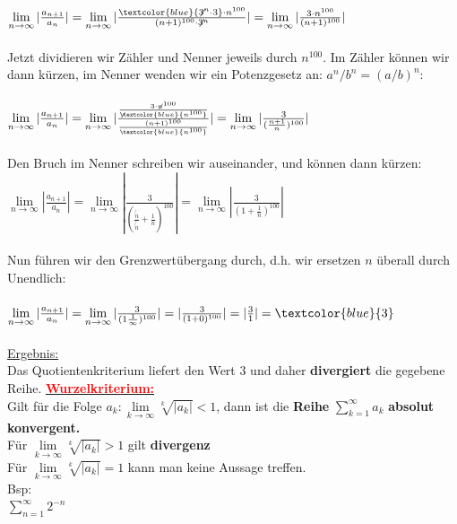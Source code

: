 \documentclass[12pt,a4paper]{article}
\begin{document}
\\
$\lim\limits_{n\rightarrow\infty}|\frac{a_{n+1}}{a_n}|=\lim\limits_{n\rightarrow\infty}|\frac{\textcolor{blue}{\not{3^n}\cdot 3}\cdot n^{100}}{(n+1)^{100}\cdot \not{3^n}}|=\lim\limits_{n\rightarrow\infty}|\frac{3\cdot n^{100}}{(n+1)^{100}}|$\\
\\
Jetzt dividieren wir Zähler und Nenner jeweils durch $n^{100}$. Im Zähler können
wir dann kürzen, im Nenner wenden wir ein Potenzgesetz an: $a^n/b^n = (a/b)^n$:\\
\\
$\lim\limits_{n\rightarrow\infty}|\frac{a_{n+1}}{a_n}|=\lim\limits_{n\rightarrow\infty}|\frac{\frac{3\cdot \not{n^{100}}}{\not{\textcolor{blue}{n^{100}}}}}{\frac{(n+1)^{100}}{\textcolor{blue}{n^{100}}}}|=\lim\limits_{n\rightarrow\infty}|\frac{3}{(\frac{n+1}{n})^{100}}|$\\
\\
Den Bruch im Nenner schreiben wir auseinander, und können dann kürzen:
\\
$\lim\limits_{n\rightarrow\infty}|\frac{a_{n+1}}{a_n}|=\lim\limits_{n\rightarrow\infty}|\frac{3}{(\frac{\not{n}}{\not{n}}+\frac{1}{n})^{100}}|=\lim\limits_{n\rightarrow\infty}|\frac{3}{(1+\frac{1}{n})^{100}}|$\\
\\
Nun führen wir den Grenzwertübergang durch, d.h. wir ersetzen $n$ überall durch Unendlich:\\
\\
$\lim\limits_{n\rightarrow\infty}|\frac{a_{n+1}}{a_n}|=\lim\limits_{n\rightarrow\infty}|\frac{3}{(1\frac{1}{\infty})^{100}}|=|\frac{3}{(1+0)^{100}}|=|\frac{3}{1}|=\textcolor{blue}{3}$\\
\\
\underline{Ergebnis:}\\
Das Quotientenkriterium liefert den Wert 3 und daher \textbf{divergiert} die gegebene Reihe.
\newpage
\underline{\textbf{\textcolor{red}{Wurzelkriterium:}}}\\
Gilt für die Folge $a_k:\lim\limits_{k\rightarrow\infty}\sqrt[k]{|a_k|}<1$, dann ist die \textbf{Reihe} $\sum\limits_{k=1}^{\infty}a_k$ \textbf{absolut konvergent.}\\
Für $\lim\limits_{k\rightarrow\infty}\sqrt[k]{|a_k|}>1$ gilt \textbf{divergenz}\\
Für $\lim\limits_{k\rightarrow\infty}\sqrt[k]{|a_k|}=1$ kann man keine Aussage treffen.\\
Bsp:\\
$\sum\limits_{n=1}^{\infty}2^{-n}$\\
\end{document}
